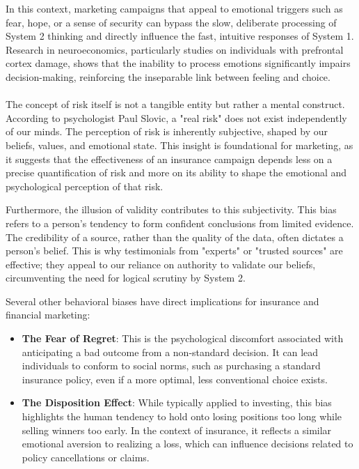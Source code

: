 \documentclass{article}
\begin{document}
In this context, marketing campaigns that appeal to emotional triggers such as fear, hope, or a sense of security can bypass the slow, deliberate processing of System 2 thinking and directly influence the fast, intuitive responses of System 1. Research in neuroeconomics, particularly studies on individuals with prefrontal cortex damage, shows that the inability to process emotions significantly impairs decision-making, reinforcing the inseparable link between feeling and choice.\\\\
The concept of risk itself is not a tangible entity but rather a mental construct. According to psychologist Paul Slovic, a "real risk" does not exist independently of our minds. The perception of risk is inherently subjective, shaped by our beliefs, values, and emotional state. This insight is foundational for marketing, as it suggests that the effectiveness of an insurance campaign depends less on a precise quantification of risk and more on its ability to shape the emotional and psychological perception of that risk.


Furthermore, the illusion of validity contributes to this subjectivity. This bias refers to a person's tendency to form confident conclusions from limited evidence. The credibility of a source, rather than the quality of the data, often dictates a person's belief. This is why testimonials from "experts" or "trusted sources" are effective; they appeal to our reliance on authority to validate our beliefs, circumventing the need for logical scrutiny by System 2.


Several other behavioral biases have direct implications for insurance and financial marketing:
\begin{itemize}
\item \textbf{The Fear of Regret}: This is the psychological discomfort associated with anticipating a bad outcome from a non-standard decision. It can lead individuals to conform to social norms, such as purchasing a standard insurance policy, even if a more optimal, less conventional choice exists.
\item \textbf{The Disposition Effect}: While typically applied to investing, this bias highlights the human tendency to hold onto losing positions too long while selling winners too early. In the context of insurance, it reflects a similar emotional aversion to realizing a loss, which can influence decisions related to policy cancellations or claims.
\end{itemize}
\end{document}
